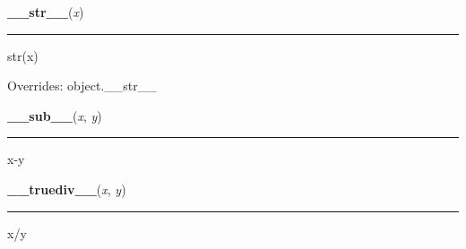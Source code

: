     \vspace{0.5ex}

    \begin{boxedminipage}{\textwidth}

    \raggedright \textbf{\_\_str\_\_}(\textit{x})

    \vspace{-1.5ex}

    \rule{\textwidth}{0.5\fboxrule}

str(x)
    \vspace{1ex}

      Overrides: object.\_\_str\_\_

    \end{boxedminipage}

    \label{numpy:ndarray:__sub__}

    \vspace{0.5ex}

    \begin{boxedminipage}{\textwidth}

    \raggedright \textbf{\_\_sub\_\_}(\textit{x}, \textit{y})

    \vspace{-1.5ex}

    \rule{\textwidth}{0.5\fboxrule}

x-y
    \vspace{1ex}

    \end{boxedminipage}

    \label{numpy:ndarray:__truediv__}

    \vspace{0.5ex}

    \begin{boxedminipage}{\textwidth}

    \raggedright \textbf{\_\_truediv\_\_}(\textit{x}, \textit{y})

    \vspace{-1.5ex}

    \rule{\textwidth}{0.5\fboxrule}

x/y
    \vspace{1ex}

    \end{boxedminipage}

    \label{numpy:ndarray:__xor__}

